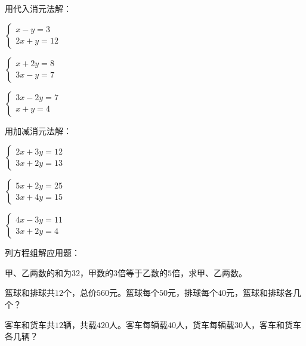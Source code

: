 \documentclass[a4paper,12pt]{ctexart}
\begin{document}
\begin{exercise}
\item 用代入消元法解：
  \begin{subexercise}
    \item $\begin{cases}x-y=3\\2x+y=12\end{cases}$
    \item $\begin{cases}x+2y=8\\3x-y=7\end{cases}$
    \item $\begin{cases}3x-2y=7\\x+y=4\end{cases}$
  \end{subexercise}

\item 用加减消元法解：
  \begin{subexercise}
    \item $\begin{cases}2x+3y=12\\3x+2y=13\end{cases}$
    \item $\begin{cases}5x+2y=25\\3x+4y=15\end{cases}$
    \item $\begin{cases}4x-3y=11\\3x+2y=4\end{cases}$
  \end{subexercise}

\item 列方程组解应用题：
  \begin{subexercise}
    \item 甲、乙两数的和为$32$，甲数的$3$倍等于乙数的$5$倍，求甲、乙两数。
    \item 篮球和排球共$12$个，总价$560$元。篮球每个$50$元，排球每个$40$元，篮球和排球各几个？
    \item 客车和货车共$12$辆，共载$420$人。客车每辆载$40$人，货车每辆载$30$人，客车和货车各几辆？
  \end{subexercise}
\end{exercise}

\newpage


\end{document}
